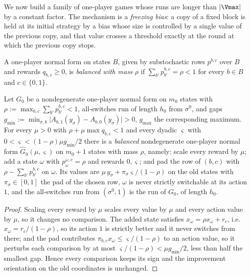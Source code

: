 We now build a family of one-player games whose runs are longer than
$|\Vmax|$ by a constant factor. The mechanism is a \emph{freezing bias}: a copy of a
fixed block is held at its initial strategy by a bias whose size is controlled by a
single value of the previous copy, and that value crosses a threshold exactly at the
round at which the previous copy stops.

\begin{definition}\label{oph:balanced}
A one-player normal form on states $B$, given by substochastic rows $p^{b,c}$ over
$B$ and rewards $q_{b,c}\ge0$, is \emph{balanced with mass $\rho$} if
$\sum_{b'}p^{b,c}_{b'}=\rho<1$ for every $b\in B$ and $c\in\{0,1\}$.
\end{definition}

\begin{lemma}\label{oph:balance}
Let $G_0$ be a nondegenerate one-player normal form on $m_0$ states with
$\rho:=\max_{b,c}\sum_{b'}p^{b,c}_{b'}<1$, all-switches run of length $h_0$ from
$\sigma^{0}$, and gaps
$g_{\min}:=\min_{\sigma,b}\bigl|A_{b,1}(y_\sigma)-A_{b,0}(y_\sigma)\bigr|>0$,
$g_{\max}$ the corresponding maximum. For every $\mu>0$ with
$\rho+\mu\max q_{b,c}<1$ and every dyadic $\varsigma$ with
$0<\varsigma<(1-\rho)\mu g_{\min}/2$ there is a \emph{balanced} nondegenerate
one-player normal form $\widehat G_0(\mu,\varsigma)$ on $m_0+1$ states with mass
$\rho$, namely: scale every reward by $\mu$; add a state $\omega$ with
$p^{\omega,c}_\omega=\rho$ and rewards $0,\varsigma$; and pad the row of $(b,c)$ with
$\rho-\sum_{b'}p^{b,c}_{b'}$ on $\omega$. Its values are
$\mu\,y_\sigma+\pi_{\sigma}\varsigma/(1-\rho)$ on the old states with
$\pi_\sigma\in[0,1]$ the pad of the chosen row, $\omega$ is never strictly switchable
at its action $1$, and the all-switches run from $(\sigma^{0},1)$ is the run of $G_0$,
of length $h_0$.
\end{lemma}

\begin{proof}
Scaling every reward by $\mu$ scales every value by $\mu$ and every action value by
$\mu$, so it changes no comparison. The added state satisfies
$x_\omega=\rho x_\omega+r_c$, i.e.\ $x_\omega=r_c/(1-\rho)$, so its action $1$ is
strictly better and it never switches from there; and the pad contributes
$\pi_{b,c}x_\omega\le\varsigma/(1-\rho)$ to an action value, so it perturbs each
comparison by at most $\varsigma/(1-\rho)<\mu g_{\min}/2$, less than half the smallest
gap. Hence every comparison keeps its sign and the improvement orientation on the old
coordinates is unchanged.
\end{proof}

